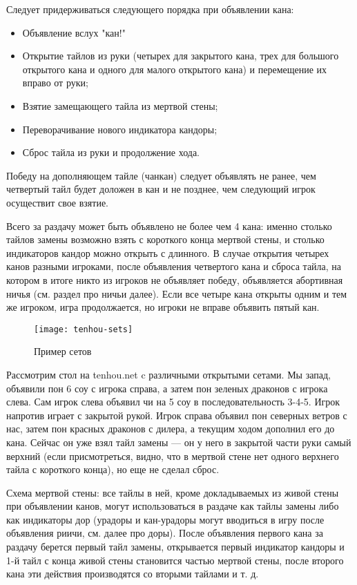 Следует придерживаться следующего порядка при объявлении кана:
\begin{itemize}
	\item Объявление вслух "кан!"
	\item Открытие тайлов из руки (четырех для закрытого кана, трех для большого открытого кана и одного для малого открытого кана) и перемещение их вправо от руки;
	\item Взятие замещающего тайла из мертвой стены;
	\item Переворачивание нового индикатора кандоры;
	\item Сброс тайла из руки и продолжение хода.
\end{itemize}

Победу на дополняющем тайле (чанкан) следует объявлять не ранее, чем четвертый тайл будет доложен в кан и не позднее, чем следующий игрок осуществит свое взятие.

Всего за раздачу может быть объявлено не более чем 4 кана: именно столько тайлов замены возможно взять с короткого конца мертвой стены, и столько индикаторов кандор можно открыть с длинного. В случае открытия четырех канов разными игроками, после объявления четвертого кана и сброса тайла, на котором в итоге никто из игроков не объявляет победу, объявляется абортивная ничья (см. раздел про ничьи далее). Если все четыре кана открыты одним и тем же игроком, игра продолжается, но игроки не вправе объявить пятый кан.

\begin{figure}[H]
	\centering
	\texttt{[image: tenhou-sets]}
	\caption{Пример сетов}
\end{figure}

Рассмотрим стол на tenhou.net c различными открытыми сетами. Мы запад, объявили пон 6 соу с игрока справа, а затем пон зеленых драконов с игрока слева. Сам игрок слева объявил чи на 5 соу в последовательность 3-4-5. Игрок напротив играет с закрытой рукой. Игрок справа объявил пон северных ветров с нас, затем пон красных драконов с дилера, а текущим ходом дополнил его до кана. Сейчас он уже взял тайл замены --- он у него в закрытой части руки самый верхний (если присмотреться, видно, что в мертвой стене нет одного верхнего тайла с короткого конца), но еще не сделал сброс.

Схема мертвой стены: все тайлы в ней, кроме докладываемых из живой стены при объявлении канов, могут использоваться в раздаче как тайлы замены либо как индикаторы дор (урадоры и кан-урадоры могут вводиться в игру после объявления риичи, см. далее про доры). После объявления первого кана за раздачу берется первый тайл замены, открывается первый индикатор кандоры и 1-й тайл с конца живой стены становится частью мертвой стены, после второго кана эти действия производятся со вторыми тайлами и т. д. 

